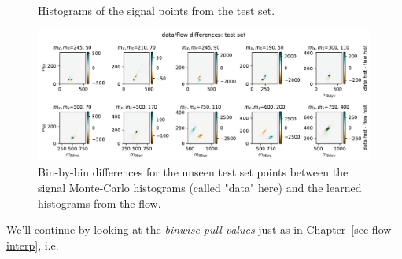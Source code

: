 \documentclass[
  11pt,
  numbers=noendperiod]{book}
\begin{document}
\begin{figure}[ht]
\\
\caption{Histograms of the signal points from the test set.}
\label{fig:flow-shapes-test}
\end{figure}

\begin{figure}[ht]
  \centering
  \includegraphics[width=\textwidth]{./images/diff-hists-test.pdf}
  \caption{\label{fig:flow-differences-test}Bin-by-bin differences for the unseen test set points between the signal Monte-Carlo histograms (called "data" here) and the learned histograms from the flow.}
\end{figure}


We'll continue by looking at the \emph{binwise pull values} just as
in Chapter~\ref{sec-flow-interp}, i.e.
\end{document}
